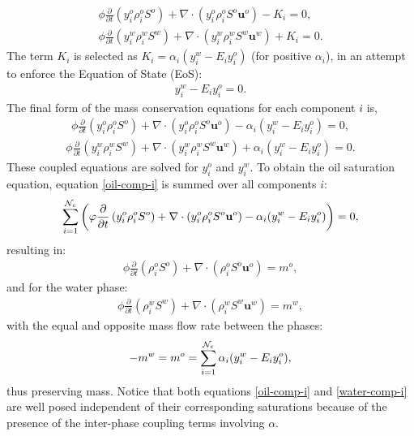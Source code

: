 \begin{eqnarray}
\phi \displaystyle\frac{\partial}{\partial t}\left(y_{i}^{o}\rho_i^{o}S^{o} \right) +
\nabla\cdot\left(y_{i}^{o}\rho_i^{o}S^{o}\mathbf{u}^{o}  \right) - K_i  = 0, \\
\phi \displaystyle\frac{\partial}{\partial t}\left(y_{i}^{w}\rho_i^{w}S^{w}  \right) +
\nabla\cdot\left( y_{i}^{w}\rho_i^{w}S^{w}\mathbf{u}^{w}  \right) + K_i = 0.
\end{eqnarray}
 The term $K_i$ is selected as $K_i=\alpha_i \left(y_i^w - E_i y_i^o\right)$ (for positive $\alpha_i$), in an attempt to enforce the Equation of State (EoS):
\begin{eqnarray}
y_i^w - E_i y_i^o=0.
\label{simple-EoS}
\end{eqnarray}
The final form of the
mass conservation equations for each component $i$ is,
\begin{eqnarray}
\phi  \displaystyle\frac{\partial}{\partial t}\left(y_{i}^{o}\rho_i^{o}S^{o} \right) +
\nabla\cdot\left(y_{i}^{o}\rho_i^{o}S^{o}\mathbf{u}^{o}  \right) - \alpha_i (y_i^w - E_i y_i^o)  = 0 ,
\label{oil-comp-i}
\end{eqnarray}
\begin{eqnarray}
\phi \displaystyle\frac{\partial}{\partial t}\left(y_{i}^{w}\rho_i^{w}S^{w}  \right) +
 \nabla\cdot\left( y_{i}^{w}\rho_i^{w}S^{w}\mathbf{u}^{w}  \right) + \alpha_i (y_i^w - E_i y_i^o) = 0 .
\label{water-comp-i}
\end{eqnarray}
These coupled equations are solved for $y_i^o$  and $y_i^w$.
To obtain the oil saturation equation, equation \ref{oil-comp-i} is summed
over all components $i$:
\begin{eqnarray}
\sum\limits_{i=1}^{{\cal N}_{c}} \bigg(
\phi \displaystyle\frac{\partial}{\partial t}\left(y_{i}^{o}\rho_i^{o}S^{o} \right) +
\nabla\cdot\left(y_{i}^{o}\rho_i^{o}S^{o}\mathbf{u}^{o}  \right) - \alpha_i (y_i^w - E_i y_i^o)\bigg)  = 0 ,
\end{eqnarray}
resulting in:
\begin{eqnarray}
\phi \displaystyle\frac{\partial}{\partial t}\left( \rho_i^{o} S^{o} \right) +
\nabla\cdot\left(\rho_i^{o} S^{o}\mathbf{u}^{o}  \right) = m^{o} ,
\end{eqnarray}
and for the water phase:
\begin{eqnarray}
\phi \displaystyle\frac{\partial}{\partial t}\left( \rho_i^{w} S^{w} \right) +
\nabla\cdot\left(\rho_i^{w} S^{w}\mathbf{u}^{w}  \right) =m^{w} ,
\end{eqnarray}
with the equal and opposite mass flow rate between the phases:
\begin{eqnarray}
-m^{w} = m^{o}= \sum\limits_{i=1}^{{\cal N}_{c}}\alpha_i (y_i^w - E_i y_i^o) ,
\end{eqnarray}
thus preserving mass. Notice that both equations \ref{oil-comp-i}
and  \ref{water-comp-i} are well posed independent of
their corresponding saturations because of the
presence of the inter-phase coupling terms involving $\alpha$.

